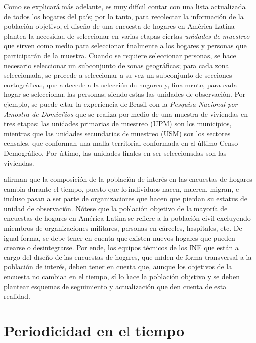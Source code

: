 \documentclass[12pt,spanish,]{book}
\begin{document}
Como se explicará más adelante, es muy difícil contar con una lista actualizada de todos los hogares del país; por lo tanto, para recolectar la información de la población objetivo, el diseño de una encuesta de hogares en América Latina plantea la necesidad de seleccionar en varias etapas ciertas \emph{unidades de muestreo} que sirven como medio para seleccionar finalmente a los hogares y personas que participarán de la muestra. Cuando se requiere seleccionar personas, se hace necesario seleccionar un subconjunto de zonas geográficas; para cada zona seleccionada, se procede a seleccionar a su vez un subconjunto de secciones cartográficas, que antecede a la selección de hogares y, finalmente, para cada hogar se seleccionan las personas; siendo estas las unidades de observación. Por ejemplo, se puede citar la experiencia de Brasil con la \emph{Pesquisa Nacional por Amostra de Domicilios} que se realiza por medio de una muestra de viviendas en tres etapas: las unidades primarias de muestreo (UPM) son los municipios, mientras que las unidades secundarias de muestreo (USM) son los sectores censales, que conforman una malla territorial conformada en el último Censo Demográfico. Por último, las unidades finales en ser seleccionadas son las viviendas.

\textcite[pág. 105]{Duncan_Kalton_1987} afirman que la composición de la población de interés en las encuestas de hogares cambia durante el tiempo, puesto que lo individuos nacen, mueren, migran, e incluso pasan a ser parte de organizaciones que hacen que pierdan su estatus de unidad de observación. Nótese que la población objetivo de la mayoría de encuestas de hogares en América Latina se refiere a la población civil excluyendo miembros de organizaciones militares, personas en cárceles, hospitales, etc. De igual forma, se debe tener en cuenta que existen nuevos hogares que pueden crearse o desintegrarse. Por ende, los equipos técnicos de los INE que están a cargo del diseño de las encuestas de hogares, que miden de forma transversal a la población de interés, deben tener en cuenta que, aunque los objetivos de la encuesta no cambian en el tiempo, sí lo hace la población objetivo y se deben plantear esquemas de seguimiento y actualización que den cuenta de esta realidad.

\hypertarget{periodicidad-en-el-tiempo}{%
\section{Periodicidad en el tiempo}\label{periodicidad-en-el-tiempo}}
\end{document}
